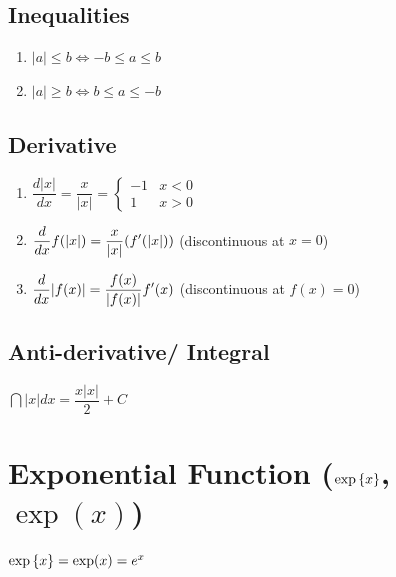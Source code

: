 \subsection*{Inequalities} \label{Basic Functions/Absolute Value function or Modulus Function/Inequalities}

\begin{enumerate}
    \item ${\displaystyle |a|\leq b\iff -b\leq a\leq b}$

    \item ${\displaystyle |a|\geq b\iff b\leq a\leq -b\ }$

\end{enumerate}

\subsection*{Derivative} \label{Basic Functions/Absolute Value function or Modulus Function/Derivative}

\begin{enumerate}
    \item $
        {\displaystyle {\dfrac {d\left|x\right|}{dx}}={\dfrac {x}{|x|}}={\begin{cases}-1&x<0\\1&x>0\end{cases}}}
    $

    \item $
        {\displaystyle {d \over dx}f(|x|)={x \over |x|}(f'(|x|))}
    $ \hfill (discontinuous at $x=0$)

    \item $
        {\displaystyle {d \over dx}|f(x)|={f(x) \over |f(x)|}f'(x)}
    $ \hfill (discontinuous at $f(x)=0$)
\end{enumerate}


\subsection*{Anti-derivative/ Integral} \label{Basic Functions/Absolute Value function or Modulus Function/Anti-derivative or Integral}

$
    {\displaystyle \dint \left|x\right|dx={\dfrac {x\left|x\right|}{2}}+C}
$













\section{Exponential Function ($\exp\left\{x\right\}$, $\exp(x)$)}

$
    \exp\left\{x\right\} = \exp(x) = e^x
$





























